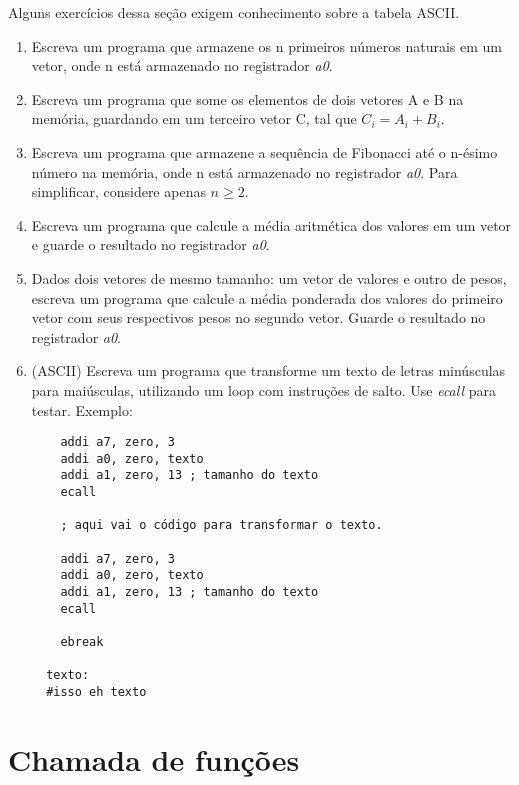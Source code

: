 \documentclass{article}
\begin{document}
Alguns exercícios dessa seção exigem conhecimento sobre a tabela ASCII.

\begin{enumerate}
  \item Escreva um programa que armazene os n primeiros números naturais em um
  vetor, onde n está armazenado no registrador \textit{a0}.

  \item Escreva um programa que some os elementos de dois vetores A e B na
  memória, guardando em um terceiro vetor C, tal que $C_i = A_i + B_i$.

  \item Escreva um programa que armazene a sequência de Fibonacci até o n-ésimo
  número na memória, onde n está armazenado no registrador \textit{a0}. Para
  simplificar, considere apenas $n \geq 2$.

  \item Escreva um programa que calcule a média aritmética dos valores em um
  vetor e guarde o resultado no registrador \textit{a0}.

  \item Dados dois vetores de mesmo tamanho: um vetor de valores e outro de
  pesos, escreva um programa que calcule a média ponderada dos valores do
  primeiro vetor com seus respectivos pesos no segundo vetor. Guarde o resultado
  no registrador \textit{a0}.

  \item (ASCII) Escreva um programa que transforme um texto de letras minúsculas
  para maiúsculas, utilizando um loop com instruções de salto. Use
  \textit{ecall} para testar. Exemplo:

  \begin{verbatim}
    addi a7, zero, 3
    addi a0, zero, texto
    addi a1, zero, 13 ; tamanho do texto
    ecall

    ; aqui vai o código para transformar o texto.

    addi a7, zero, 3
    addi a0, zero, texto
    addi a1, zero, 13 ; tamanho do texto
    ecall

    ebreak

  texto:
  #isso eh texto
  \end{verbatim}

\end{enumerate}

\section{Chamada de funções}
\end{document}
